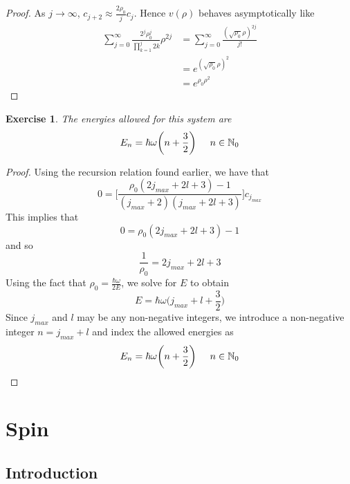 \documentclass[12pt]{amsart}
\newtheorem{ex}[thm]{Exercise}
\newcommand{\om}{\omega}
\newcommand{\N}{\mathbb{N}}
\begin{document}
\begin{proof}
As $j \rightarrow \infty$, $c_{j+2} \approx \frac{2 \rho_0}{j}c_j$. Hence $v(\rho)$ behaves asymptotically like 
\begin{align*}
\sum_{j=0}^{\infty}\frac{2^j\rho_0^j}{\prod_{k=1}^j2k}\rho^{2j}
&= \sum_{j=0}^{\infty}\frac{(\sqrt{\rho_0} \rho)^{2j}}{j!}\\
&= e^{(\sqrt{\rho_0}\rho)^2}\\
&= e^{\rho_0 \rho^2}
\end{align*}
\end{proof}

\begin{ex}
The energies allowed for this system are $$E_n = \hbar \om \bigg(n+\frac{3}{2} \bigg) \hspace{.5cm}n \in \N_0$$
\end{ex}

\begin{proof}
Using the recursion relation found earlier, we have that $$0 = \bigg[ \frac{\rho_0(2j_{max}+2l+3)-1}{(j_{max}+2)(j_{max}+2l+3)}\bigg]c_{j_{max}} $$ This implies that $$0 = \rho_0(2j_{max}+2l+3)-1$$ and so $$\frac{1}{\rho_0} = 2j_{max} + 2l +3$$ Using the fact that $\rho_0 = \frac{\hbar \om}{2E}$, we solve for $E$ to obtain $$E = \hbar \om \bigg( j_{max} + l + \frac{3}{2}\bigg)$$ Since $j_{max}$ and $l$ may be any non-negative integers, we introduce a non-negative integer $n = j_{max}+l$ and index the allowed energies as $$E_n = \hbar \om\bigg(n+ \frac{3}{2} \bigg) \hspace{.5cm} n \in \N_0$$
\end{proof}
\newpage

\section{Spin}

\subsection{Introduction}
\end{document}
